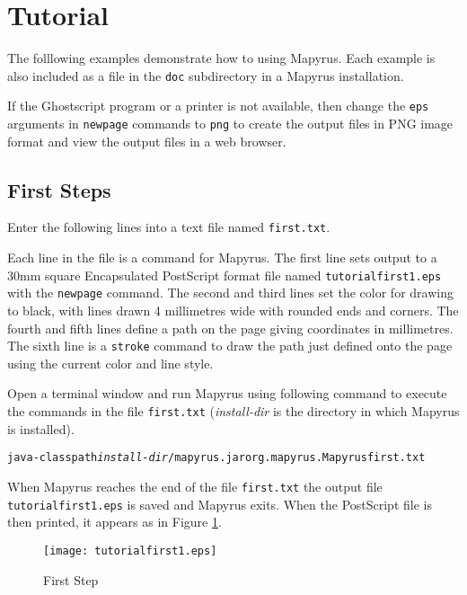 
\section{Tutorial}

The folllowing examples demonstrate how to using Mapyrus.  Each example is also
included as a file in the \texttt{doc} subdirectory in a Mapyrus installation.

If the Ghostscript program or a printer is not available, then change the
\texttt{eps} arguments in \texttt{newpage} commands to \texttt{png} to create
the output files in PNG image format and view the output files in a web
browser.

\subsection{First Steps}

Enter the following lines into a text file named \texttt{first.txt}.



Each line in the file is a command for Mapyrus.  The first line sets output to
a 30mm square Encapsulated PostScript format file named
\texttt{tutorialfirst1.eps} with the \texttt{newpage} command.  The second and
third lines set the color for drawing to black, with lines drawn 4 millimetres
wide with rounded ends and corners.  The fourth and fifth lines define a path
on the page giving coordinates in millimetres.  The sixth line is a
\texttt{stroke} command to draw the path just defined onto the page using the
current color and line style.

Open a terminal window and run Mapyrus using following command to execute the
commands in the file \texttt{first.txt} (\textit{install-dir} is the directory
in which Mapyrus is installed).

\begin{alltt}
java -classpath \textit{install-dir}/mapyrus.jar org.mapyrus.Mapyrus first.txt
\end{alltt}

When Mapyrus reaches the end of the file \texttt{first.txt}
the output file \texttt{tutorialfirst1.eps} is saved and Mapyrus exits.
When the PostScript file is then printed, it appears as in
Figure \ref{tutorialfirst1}.

\begin{figure}[h]
\texttt{[image: tutorialfirst1.eps]}
\caption{First Step}
\label{tutorialfirst1}
\end{figure}


